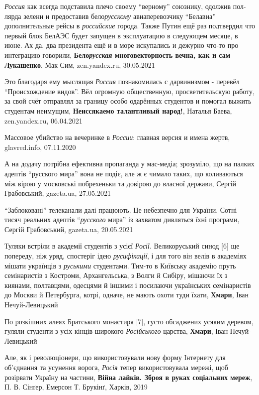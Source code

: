 \emph{Россия} как всегда подставила плечо своему \enquote{верному} союзнику,
одолжив пол-лярда зелени и предоставив бело\emph{русскому} авиаперевозчику
\enquote{Белавиа} дополнительные рейсы в \emph{российские} города.  Также Путин
ещё раз подтвердил что первый блок БелАЭС будет запущен в эксплуатацию в
следующем месяце, в июне. Ах да, два президента ещё и в море искупались и
дежурно что-то про интеграцию говорили, \textbf{Бело\emph{русская}
многовекторность вечна, как и сам Лукашенко}, Мак Сим, zen.yandex.ru,
30.05.2021

Это благодаря ему мыслящая \emph{Россия} познакомилась с дарвинизмом - перевёл
\enquote{Происхождение видов}. Вёл огромную общественную, просветительскую
работу, за свой счёт отправлял за границу особо одарённых студентов и помогал
выжить студентам неимущим, \textbf{Неиссякаемо талантливый народ!}, Наталья
Баева, zen.yandex.ru, 06.04.2021

Массовое убийство на вечеринке в \emph{России}: главная версия и имена жертв,
glavred.info, 07.11.2020

А на додачу потрібна ефективна пропаганда у мас-медіа; зрозуміло, що на палких
адептів \enquote{русского мира} вона не подіє, але ж є чимало таких, що
коливаються між вірою у московські побрехеньки та довірою до власної держави,
Сергій Грабовський, gazeta.ua, 27.05.2021

\enquote{Заблоковані} телеканали далі працюють. Це небезпечно для України.
Сотні тисяч реальних адептів \enquote{\emph{русского} мира} із захватом
дивляться їхні програми, Сергій Грабовський, gazeta.ua, 20.05.2021

Туляки встріли в академії студентів з усієї \emph{Росії}. Великоруський синод
[6] ще попереду, ніж уряд, спостеріг ідею \emph{русифікації}, і для того він
велів в академіях мішати українців з \emph{руськими} студентами. Тим-то в
Київську академію пруть семінаристів з Костроми, Архангельська, з Волги й
Сибіру, мішаючи їх з киянами, полтавцями, одесцями й іншими і посилаючи
українських семінаристів до Москви й Петербурга, котрі, одначе, не мають охоти
туди їхати, \textbf{Хмари}, Іван Нечуй-Левицький

По розкішних алеях Братського монастиря [7], густо обсаджених усяким деревом,
гуляли студенти з усіх кінців широкого \emph{Російського} царства,
\textbf{Хмари}, Іван Нечуй-Левицький

Але, як і революціонери, що використовували нову форму Інтернету для об'єднання
та усунення ворога, \emph{Росія} тепер використовувала мережі, щоб розірвати Україну
на частини, \textbf{Війна лайків. Зброя в руках соціальних мереж}, П. В.
Сінґер, Емерсон Т. Брукінґ, Харків, 2019

